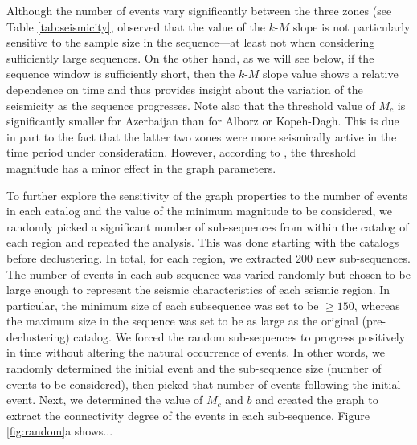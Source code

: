 Although the number of events vary significantly between the three zones (see Table \ref{tab:seismicity}, \citet{Telesca2013} observed that the value of the $k$-$M$ slope is not particularly sensitive to the sample size in the sequence---at least not when considering sufficiently large sequences. On the other hand, as we will see below, if the sequence window is sufficiently short, then the $k$-$M$ slope value shows a relative dependence on time and thus provides insight about the variation of the seismicity as the sequence progresses. Note also that the threshold value of $M_c$ is significantly smaller for Azerbaijan than for Alborz or Kopeh-Dagh. This is due in part to the fact that the latter two zones were more seismically active in the time period under consideration. However, according to \citet{Telesca2012}, the threshold magnitude has a minor effect in the graph parameters.

To further explore the sensitivity of the graph properties to the number of events in each catalog and the value of the minimum magnitude to be considered, we randomly picked a significant number of sub-sequences from within the catalog of each region and repeated the analysis. This was done starting with the catalogs before declustering. In total, for each region, we extracted 200 new sub-sequences. The number of events in each sub-sequence was varied randomly but chosen to be large enough to represent the seismic characteristics of each seismic region. In particular, the minimum size of each subsequence was set to be $\geq 150$, whereas the maximum size in the sequence was set to be as large as the original (pre-declustering) catalog. We forced the random sub-sequences to progress positively in time without altering the natural occurrence of events. In other words, we randomly determined the initial event and the sub-sequence size (number of events to be considered), then picked that number of events following the initial event. Next, we determined the value of $M_c$ and $b$ and created the graph to extract the connectivity degree of the events in each sub-sequence. Figure \ref{fig:random}a shows...




